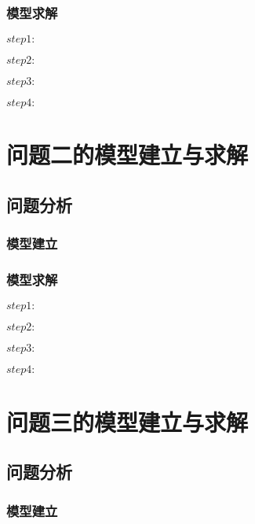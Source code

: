 \documentclass[UTF8]{ctexart}
\begin{document}
\subsubsection{模型求解}

\textbf{$step1:$}

\textbf{$step2:$}

\textbf{$step3:$}

\textbf{$step4:$}






\section{问题二的模型建立与求解}
\subsection{问题分析}



\subsubsection{模型建立}



\subsubsection{模型求解}

\textbf{$step1:$}

\textbf{$step2:$}

\textbf{$step3:$}

\textbf{$step4:$}







\section{问题三的模型建立与求解}
\subsection{问题分析}



\subsubsection{模型建立}
\end{document}
